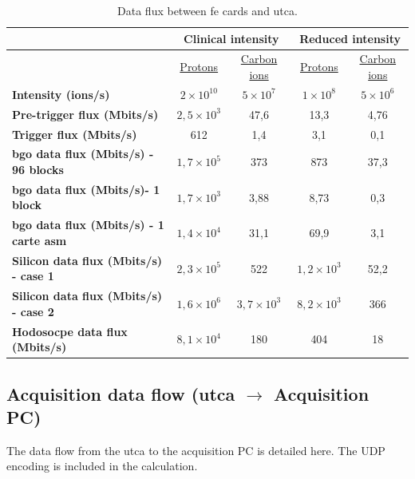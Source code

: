 {\begin{table} [!htbp]
\centering
\caption{Data flux between \gls{fe} cards and \gls{utca}.}
\label{chapappA::tab::dataFlowFEuTCA}
\begin{tabular}{m{3.5cm} c c c c}
\toprule
\rowcolor{myColorMainA!20}
		&\multicolumn{2}{c}{\textbf{Clinical intensity}} &\multicolumn{2}{c}{\textbf{Reduced intensity}} \\
\midrule
		& \underline{Protons}& \underline{Carbon ions} & \underline{Protons}& \underline{Carbon ions} \\
\midrule
\textbf{Intensity (ions/s)}		& $2\times10^{10}$	&$5\times10^{7}$  & $1\times10^{8}$& $5\times10^{6}$  \\
\textbf{Pre-trigger flux (Mbits/s)}		& 	$2,5\times10^{3}$& 47,6 &  13,3&4,76 \\
\textbf{Trigger flux (Mbits/s)}		& 	612& 1,4 & 3,1&0,1\\
\textbf{\gls{bgo} data flux (Mbits/s) - 96 blocks}		& 	$1,7\times10^{5}$& 373 & 873&37,3\\
\textbf{\gls{bgo} data flux (Mbits/s)- 1 block}		& 	$1,7\times10^{3}$& 3,88 & 8,73&0,3 \\
\textbf{\gls{bgo} data flux (Mbits/s) - 1 carte \gls{asm}}		& 	$1,4\times10^{4}$& 31,1 & 69,9&3,1\\
\textbf{Silicon data flux (Mbits/s) - case 1}		& 	$2,3\times10^{5}$& 522 & $1,2\times10^{3}$ & 52,2 \\
\textbf{Silicon data flux (Mbits/s) - case 2}		& 	$1,6\times10^{6}$&  $ 3,7\times10^{3}$ &  $8,2\times10^{3}$&366 \\
\textbf{Hodosocpe data flux (Mbits/s)}		& 	$8,1\times10^{4}$& 180 & 404 &18\\
\bottomrule
\end{tabular}
\end{table}



\subsection{Acquisition data flow (\gls{utca} $\rightarrow$ Acquisition PC)}\label{chapappA::subsec::daqDataFlow}

The data flow from the \gls{utca} to the acquisition PC is detailed here. The UDP encoding is included in the calculation.

}
